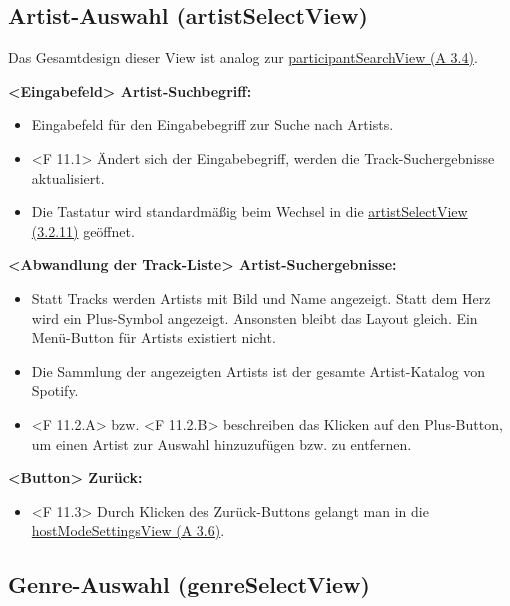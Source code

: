 \documentclass[oneside, ngerman]{sdqtechreport}
\begin{document}
\subsection{Artist-Auswahl (artistSelectView)}
\label{sec:Benutzeroberfläche:artistSelectView}
\hypertarget{artistSelectView}{}

Das Gesamtdesign dieser View ist analog zur \hyperlink{participantSearchView}{participantSearchView (A 3.4)}.

\textbf{<Eingabefeld> Artist-Suchbegriff:}
\begin{itemize}
    \item Eingabefeld für den Eingabebegriff zur Suche nach Artists.
    \item <F 11.1> Ändert sich der Eingabebegriff, werden die Track-Suchergebnisse aktualisiert.
    \item Die Tastatur wird standardmäßig beim Wechsel in die \hyperlink{artistSelectView}{artistSelectView (3.2.11)} geöffnet.
\end{itemize}

\textbf{<Abwandlung der Track-Liste> Artist-Suchergebnisse:}
\begin{itemize}
    \item Statt Tracks werden Artists mit Bild und Name angezeigt. Statt dem Herz wird ein Plus-Symbol angezeigt. Ansonsten bleibt das Layout gleich. Ein Menü-Button für Artists existiert nicht.
    \item Die Sammlung der angezeigten Artists ist der gesamte Artist-Katalog von Spotify.
    \hypertarget{<F 11.2.A>}{}
    \hypertarget{<F 11.2.B>}{}
    \item <F 11.2.A> bzw. <F 11.2.B> beschreiben das Klicken auf den Plus-Button, um einen Artist zur Auswahl hinzuzufügen bzw. zu entfernen.
\end{itemize}

\textbf{<Button> Zurück:}
\begin{itemize}
    \hypertarget{<F 11.3>}{}
    \item <F 11.3> Durch Klicken des Zurück-Buttons gelangt man in die  \hyperlink{hostModeSettingsView}{hostModeSettingsView (A 3.6)}.
\end{itemize}


\subsection{Genre-Auswahl (genreSelectView)}
\label{sec:Benutzeroberfläche:genreSelectView}
\hypertarget{genreSelectView}{}
\end{document}

